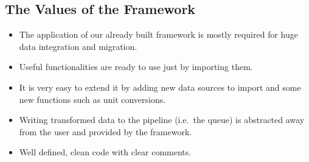 \subsection{The Values of the
Framework}\label{the-values-of-the-framework}

\begin{itemize}
\tightlist
\item
  The application of our already built framework is mostly required for
  huge data integration and migration.
\item
  Useful functionalities are ready to use just by importing them.
\item
  It is very easy to extend it by adding new data sources to import and
  some new functions such as unit conversions.
\item
  Writing transformed data to the pipeline (i.e.~the queue) is
  abstracted away from the user and provided by the framework.
\item
  Well defined, clean code with clear comments.
\end{itemize}
